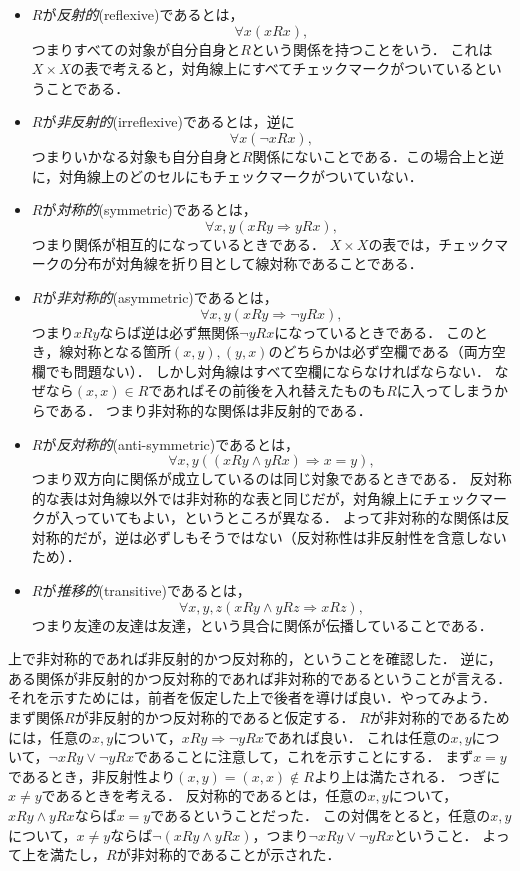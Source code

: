 \documentclass[dvipdfmx, 11pt,a4paper]{jsarticle}
\begin{document}
\begin{itemize}
 \item $R$が\emph{反射的}(reflexive)であるとは，
       \[ \forall x ( xRx ), \]
       つまりすべての対象が自分自身と$R$という関係を持つことをいう．
       これは$X \times X$の表で考えると，対角線上にすべてチェックマークがついているということである．
 \item $R$が\emph{非反射的}(irreflexive)であるとは，逆に
       \[ \forall x ( \neg xRx ), \]
       つまりいかなる対象も自分自身と$R$関係にないことである．この場合上と逆に，対角線上のどのセルにもチェックマークがついていない．
 \item $R$が\emph{対称的}(symmetric)であるとは，
       \[ \forall x, y ( xRy \Rightarrow yRx ), \]
       つまり関係が相互的になっているときである．
       $X \times X$の表では，チェックマークの分布が対角線を折り目として線対称であることである．
 \item $R$が\emph{非対称的}(asymmetric)であるとは，
       \[  \forall x, y ( xRy \Rightarrow \neg yRx ), \]
       つまり$xRy$ならば逆は必ず無関係$\neg yRx$になっているときである．
       このとき，線対称となる箇所$(x,y), (y,x)$のどちらかは必ず空欄である（両方空欄でも問題ない）．
       しかし対角線はすべて空欄にならなければならない．
       なぜなら$(x,x) \in R$であればその前後を入れ替えたものも$R$に入ってしまうからである．
       つまり非対称的な関係は非反射的である．
 \item $R$が\emph{反対称的}(anti-symmetric)であるとは，
       \[ \forall x, y (( xRy \wedge yRx)  \Rightarrow x=y), \]
       つまり双方向に関係が成立しているのは同じ対象であるときである．
       反対称的な表は対角線以外では非対称的な表と同じだが，対角線上にチェックマークが入っていてもよい，というところが異なる．
       よって非対称的な関係は反対称的だが，逆は必ずしもそうではない（反対称性は非反射性を含意しないため）．
 \item $R$が\emph{推移的}(transitive)であるとは，
       \[ \forall x, y, z  ( xRy \wedge yRz \Rightarrow xRz), \]
       つまり友達の友達は友達，という具合に関係が伝播していることである．
\end{itemize}


上で非対称的であれば非反射的かつ反対称的，ということを確認した．
逆に，ある関係が非反射的かつ反対称的であれば非対称的であるということが言える．
それを示すためには，前者を仮定した上で後者を導けば良い．やってみよう．
まず関係$R$が非反射的かつ反対称的であると仮定する．
$R$が非対称的であるためには，任意の$x,y$について，$xRy \Rightarrow \neg yRx$であれば良い．
これは任意の$x,y$について，$\neg xRy \vee \neg yRx$であることに注意して，これを示すことにする．
まず$x=y$であるとき，非反射性より$(x,y) = (x,x) \not\in R$より上は満たされる．
つぎに$x\neq y$であるときを考える．
反対称的であるとは，任意の$x,y$について，$xRy \wedge yRx$ならば$x=y$であるということだった．
この対偶をとると，任意の$x,y$について，$x\neq y$ならば$\neg (xRy \wedge yRx)$，つまり$\neg xRy \vee \neg yRx$ということ．
よって上を満たし，$R$が非対称的であることが示された．
\end{document}
